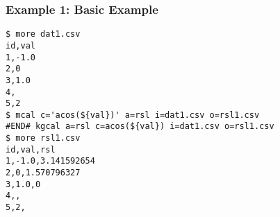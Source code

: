 \subsubsection*{Example 1: Basic Example}



\begin{Verbatim}[baselinestretch=0.7,frame=single]
$ more dat1.csv
id,val
1,-1.0
2,0
3,1.0
4,
5,2
$ mcal c='acos(${val})' a=rsl i=dat1.csv o=rsl1.csv
#END# kgcal a=rsl c=acos(${val}) i=dat1.csv o=rsl1.csv
$ more rsl1.csv
id,val,rsl
1,-1.0,3.141592654
2,0,1.570796327
3,1.0,0
4,,
5,2,
\end{Verbatim}
